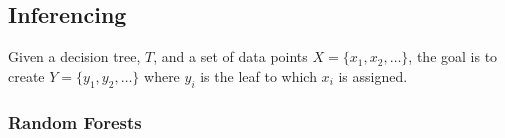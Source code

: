 \documentclass[12pt,letterpaper]{article}
\begin{document}
\subsection{Inferencing}

Given a decision tree, \(T\), and a set of data points \(X = \{x_1, x_2,
\ldots\}\), the goal is to create \(Y = \{y_1, y_2, \ldots\}\) where \(y_i\) is
the leaf to which \(x_i\) is assigned.



\subsubsection{Random Forests}



\end{document}
